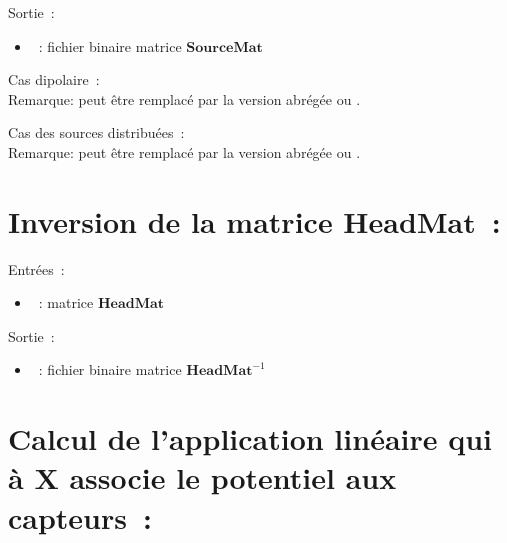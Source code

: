 \noindent
Sortie~:
\begin{itemize}
    \item {}~: fichier binaire matrice $\mathbf{SourceMat}$
\end{itemize}

\medskip

\noindent
Cas dipolaire~:\\
\noindent
{}
\medskip
Remarque:  peut être remplacé par la version abrégée  ou .

\medskip

\noindent
Cas des sources distribuées~:\\
\noindent
{}
\medskip
Remarque:  peut être remplacé par la version abrégée  ou .

\section{Inversion de la matrice $\mathbf{HeadMat}$~:}
\label{sect: command invert HeadMat}

\noindent
Entrées~:
\begin{itemize}
    \item {}~: matrice $\mathbf{HeadMat}$
\end{itemize}

\noindent
Sortie~:
\begin{itemize}
    \item {}~: fichier binaire matrice $\mathbf{HeadMat}^{-1}$
\end{itemize}

\medskip

\noindent
{}

\section{Calcul de l'application linéaire qui à X associe le potentiel aux capteurs~:}
\label{sect: command assemble sensors}

